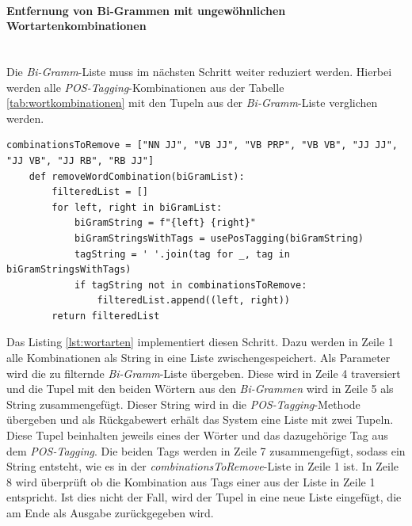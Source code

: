 \paragraph{Entfernung von Bi-Grammen mit ungewöhnlichen Wortartenkombinationen}\mbox{}\\
Die \emph{Bi-Gramm}-Liste muss im nächsten Schritt weiter reduziert werden. Hierbei werden alle \emph{POS-Tagging}-Kombinationen aus der Tabelle \ref{tab:wortkombinationen} mit den Tupeln aus der \emph{Bi-Gramm}-Liste verglichen werden.
\begin{lstlisting}[caption={Implementation der Filterung von Wortartenkombinationen}, label=lst:wortarten]
	combinationsToRemove = ["NN JJ", "VB JJ", "VB PRP", "VB VB", "JJ JJ", "JJ VB", "JJ RB", "RB JJ"]
	def removeWordCombination(biGramList):
		filteredList = []
		for left, right in biGramList:
			biGramString = f"{left} {right}"
			biGramStringsWithTags = usePosTagging(biGramString)
			tagString = ' '.join(tag for _, tag in biGramStringsWithTags)
			if tagString not in combinationsToRemove:
				filteredList.append((left, right))
		return filteredList
\end{lstlisting}
Das Listing \ref{lst:wortarten} implementiert diesen Schritt. Dazu werden in Zeile 1 alle Kombinationen als String in eine Liste zwischengespeichert. Als Parameter wird die zu filternde \emph{Bi-Gramm}-Liste übergeben. Diese wird in Zeile 4 traversiert und die Tupel mit den beiden Wörtern aus den \emph{Bi-Grammen} wird in Zeile 5 als String zusammengefügt. Dieser String wird in die \emph{POS-Tagging}-Methode übergeben und als Rückgabewert erhält das System eine Liste mit zwei Tupeln. Diese Tupel beinhalten jeweils eines der Wörter und das dazugehörige Tag aus dem \emph{POS-Tagging}. Die beiden Tags werden in Zeile 7 zusammengefügt, sodass ein String entsteht, wie es in der \emph{combinationsToRemove}-Liste in Zeile 1 ist. In Zeile 8 wird überprüft ob die Kombination aus Tags einer aus der Liste in Zeile 1 entspricht. Ist dies nicht der Fall, wird der Tupel in eine neue Liste eingefügt, die am Ende als Ausgabe zurückgegeben wird.
